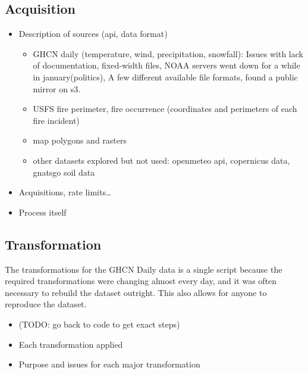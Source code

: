 \documentclass[
  12pt,
  letterpaper,
  DIV=11,
  numbers=noendperiod]{scrartcl}
\providecommand{\tightlist}{%
  \setlength{\itemsep}{0pt}\setlength{\parskip}{0pt}}\usepackage{longtable,booktabs,array}
\begin{document}
\subsection{Acquisition}\label{acquisition}

\begin{itemize}
\tightlist
\item
  Description of sources (api, data format)

  \begin{itemize}
  \tightlist
  \item
    GHCN daily (temperature, wind, precipitation, snowfall): Issues with
    lack of documentation, fixed-width files, NOAA servers went down for
    a while in january(politics), A few different available file
    formats, found a public mirror on s3.\\
  \item
    USFS fire perimeter, fire occurrence (coordinates and perimeters of
    each fire incident)\\
  \item
    map polygons and rasters\\
  \item
    other datasets explored but not used: openmeteo api, copernicus
    data, gnatsgo soil data\\
  \end{itemize}
\item
  Acquisitions, rate limits\ldots{}\\
\item
  Process itself
\end{itemize}

\subsection{Transformation}\label{transformation}

The transformations for the GHCN Daily data is a single script because
the required transformations were changing almost every day, and it was
often necessary to rebuild the dataset outright. This also allows for
anyone to reproduce the dataset.

\begin{itemize}
\tightlist
\item
  (TODO: go back to code to get exact steps)\\
\item
  Each transformation applied\\
\item
  Purpose and issues for each major transformation
\end{itemize}
\end{document}
